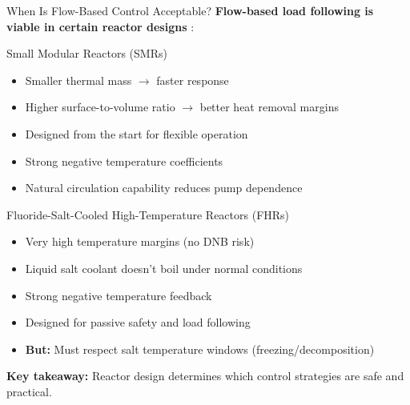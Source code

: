 \documentclass[aspectratio=169]{beamer}
\begin{document}
\begin{frame}[allowframebreaks]{When Is Flow-Based Control Acceptable?}
    \textbf{Flow-based load following is viable in certain reactor designs} \cite{zhang2024load}:

    \vspace{1em}
    \begin{block}{Small Modular Reactors (SMRs)}
        \begin{itemize}
            \item Smaller thermal mass $\rightarrow$ faster response
            \item Higher surface-to-volume ratio $\rightarrow$ better heat removal margins
            \item Designed from the start for flexible operation
            \item Strong negative temperature coefficients
            \item Natural circulation capability reduces pump dependence
        \end{itemize}
    \end{block}

    \vspace{1em}
    \begin{block}{Fluoride-Salt-Cooled High-Temperature Reactors (FHRs)}
        \begin{itemize}
            \item Very high temperature margins (no DNB risk)
            \item Liquid salt coolant doesn't boil under normal conditions
            \item Strong negative temperature feedback
            \item Designed for passive safety and load following
            \item \textbf{But:} Must respect salt temperature windows (freezing/decomposition)
        \end{itemize}
    \end{block}

    \vspace{1em}
    \textbf{Key takeaway:} Reactor design determines which control strategies are safe and practical.
\end{frame}
\end{document}

